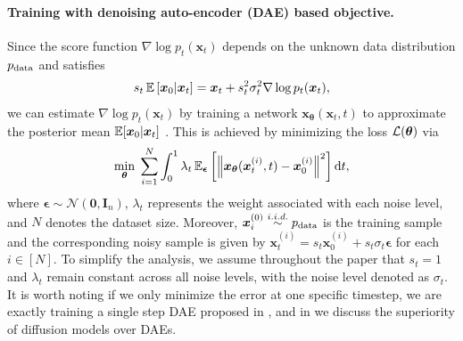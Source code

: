 \paragraph{Training with denoising auto-encoder (DAE) based objective.} Since the score function $\nabla \log p_t(\bm x_t)$ depends on the unknown data distribution $p_{\rm data}$ and satisfies
\begin{align} \label{eq:Tweedie} s_t\operatorname{\mathbb{E}}\left[ \bm x_0 \vert \bm x_t \right] = \bm x_t + s_t^2\sigma_t^2 \nabla \log p_t(\bm x_t), \end{align}
we can estimate $\nabla \log p_t(\bm x_t)$ by training a network $\bm x_{\bm \theta}(\bm x_t, t)$ to approximate the posterior mean $\operatorname{\mathbb{E}}[\bm x_0 \vert \bm x_t]$ \citep{chen2024deconstructing, xiang2023denoising, kadkhodaie2023generalization}. This is achieved by minimizing the loss $\mathcal{L}(\bm \theta)$ via
\begin{align}
   \min_{\bm \theta}\; \sum_{i=1}^N \int_0^1 \lambda_t   \operatorname{\mathbb{E}}_{\bm \epsilon } \left[\left\|\bm x_{\bm \theta}(\bm x_t^{(i)}, t) -  \bm x_0^{(i)} \right\|^2\right] \mathrm{d}t, \label{eq:dae_loss}
\end{align}
where $\bm \epsilon \sim \mathcal{N}(\bm 0, \bm I_n)$, $\lambda_t$ represents the weight associated with each noise level, and $N$ denotes the dataset size. Moreover, $\bm x_i^{(0)} \overset{i.i.d.}{\sim} p_{\rm data}$ is the training sample and the corresponding noisy sample is given by $\bm x_t^{(i)} = s_t \bm x_0^{(i)} + s_t\sigma_t\bm \epsilon$ for each $i\in [N]$. To simplify the analysis, we assume throughout the paper that $s_t = 1$ and $\lambda_t$ remain constant across all noise levels, with the noise level denoted as $\sigma_t$. It is worth noting if we only minimize the error at one specific timestep, we are exactly training a single step DAE proposed in \citep{vincent2011connection}, and in  we discuss the superiority of diffusion models over DAEs.



